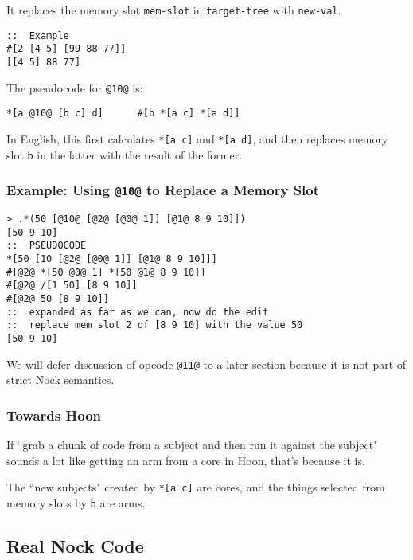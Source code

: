 \documentclass[twoside]{article}
\begin{document}
\noindent{}
It replaces the memory slot \lstinline[style=inlinecode]{mem-slot} in \lstinline[style=inlinecode]{target-tree} with \lstinline[style=inlinecode]{new-val}.

\begin{lstlisting}[style=listingcode]
::  Example
#[2 [4 5] [99 88 77]]
[[4 5] 88 77]
\end{lstlisting}

\noindent{}
The pseudocode for \lstinline[style=inlinecode]{@10@} is:

\begin{lstlisting}[style=listingcode]
*[a @10@ [b c] d]      #[b *[a c] *[a d]]
\end{lstlisting}

In English, this first calculates \lstinline[style=inlinecode]{*[a c]} and \lstinline[style=inlinecode]{*[a d]}, and then replaces memory slot \lstinline[style=inlinecode]{b} in the latter with the result of the former.

\subsubsection{Example: Using \lstinline[style=inlinecode]{@10@} to Replace a Memory Slot}

\begin{lstlisting}[style=listingcode]
> .*(50 [@10@ [@2@ [@0@ 1]] [@1@ 8 9 10]])
[50 9 10]
::  PSEUDOCODE
*[50 [10 [@2@ [@0@ 1]] [@1@ 8 9 10]]]
#[@2@ *[50 @0@ 1] *[50 @1@ 8 9 10]]
#[@2@ /[1 50] [8 9 10]]
#[@2@ 50 [8 9 10]]
::  expanded as far as we can, now do the edit
::  replace mem slot 2 of [8 9 10] with the value 50
[50 9 10]
\end{lstlisting}

We will defer discussion of opcode \lstinline[style=inlinecode]{@11@} to a later section because it is not part of strict Nock semantics.

\subsubsection{Towards Hoon}

If ``grab a chunk of code from a subject and then run it against the subject" sounds a lot like getting an arm from a core in Hoon, that's because it is.

The ``new subjects" created by \lstinline[style=inlinecode]{*[a c]} are cores, and the things selected from memory slots by \lstinline[style=inlinecode]{b} are arms.

\subsection{Real Nock Code}
\end{document}
